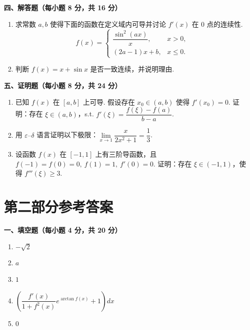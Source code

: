 \documentclass[a4paper,11pt]{ctexart}
\begin{document}
\vspace{0.8em}
\textbf{四、解答题（每小题 8 分，共 16 分）}

\begin{enumerate}[label=\arabic*., leftmargin=2em, itemsep=0.9em, topsep=0.5em]
  \item 求常数 $a,b$ 使得下面的函数在定义域内可导并讨论 $f'(x)$ 在 $0$ 点的连续性.
  \[
    f(x) = \begin{cases}
      \dfrac{\sin^2(ax)}{x}, & x > 0, \\[0.6em]
      (2a-1)x + b, & x \le 0.
    \end{cases}
  \]

  \item 判断 $f(x) = x + \sin x$ 是否一致连续，并说明理由.
\end{enumerate}

\vspace{0.8em}
\textbf{五、证明题（每小题 8 分，共 24 分）}

\begin{enumerate}[label=\arabic*., leftmargin=2em, itemsep=0.9em, topsep=0.5em]
  \item 已知 $f(x)$ 在 $[a,b]$ 上可导. 假设存在 $x_0\in(a,b)$ 使得 $f'(x_0)=0$. 证明：存在 $\xi\in(a,b)$，s.t. $f'(\xi) = \dfrac{f(\xi)-f(a)}{b-a}$.

  \item 用 $\varepsilon\text{--}\delta$ 语言证明以下极限：$\lim\limits_{x\to 1}\dfrac{x}{2x^2+1} = \dfrac{1}{3}$.

  \item 设函数 $f(x)$ 在 $[-1,1]$ 上有三阶导函数，且 $f(-1)=f(0)=0,\ f(1)=1,\ f'(0)=0$. 证明：存在 $\xi\in(-1,1)$，使得 $f'''(\xi) \ge 3$.
\end{enumerate}

\newpage

\section*{第二部分\quad 参考答案}

\textbf{一、填空题（每小题 4 分，共 20 分）}

\begin{enumerate}[label=\arabic*., leftmargin=2em, itemsep=0.55em, topsep=0.4em]
  \item $-\sqrt{2}$
  \item $a$
  \item $1$
  \item $\left(\dfrac{f'(x)}{1+f^2(x)}e^{\arctan f(x)} + 1\right)dx$
  \item $0$
\end{enumerate}
\end{document}
